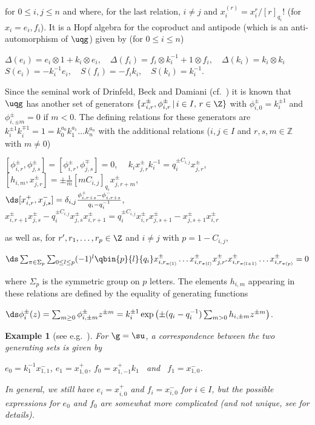 \documentclass[11pt]{amsart}
\newtheorem{example}[theorem]{Example}
\theoremstyle{definition}
\theoremstyle{remark}
\numberwithin{equation}{section}
\begin{document}
for $0\leq i,j \leq n$ and where, for the last relation, $i\neq j$ and $x_i^{(r)} = x_i^r/[r]_{q_i}!$ (for $x_i = e_i,f_i$). It is a Hopf algebra for the coproduct and antipode (which is an anti-automorphism of $\uqg$) given by (for $0\leq i\leq n$)
\begin{center}
$\Delta(e_i) = e_i\otimes 1+k_i\otimes e_i, \quad \Delta(f_i) = f_i\otimes k_i^{-1}+1\otimes f_i, \quad \Delta(k_i) = k_i\otimes k_i$ \smallskip\\
$ S(e_i) = -k_i^{-1}e_i, \quad S(f_i) = -f_ik_i, \quad S(k_i) = k_i^{-1}.$
\end{center}
Since the seminal work of Drinfeld, Beck and Damiani (cf.~\cite{dr1,b,da1,da2}) it is known that $\uqg$ has another set of generators $\{x_{i,r}^{\pm}, \phi_{i,r}^{\pm}\,|\, i\in I,\, r \in \Z\}$ with $\phi_{i,0}^{\pm}=k_i^{\pm 1}$ and $\phi_{i,\pm m}^{\pm} = 0$ if $m < 0$. The defining relations for these generators are $k_i^{\pm 1}k_i^{\mp 1} = 1 = k_0^{a_0}k_1^{a_1}\dots k_n^{a_n}$ with the additional relations ($i,j \in I$ and $r,s,m \in \mathbb{Z}$ with $m\neq 0$)
\begin{center}
$[\phi_{i,r}^{\pm},\phi_{j,s}^{\pm}] = [\phi_{i,r}^{\pm},\phi_{j,s}^{\mp}] = 0$, \ \ 
$k_i x_{j,r}^{\pm} k_i^{-1} = q_i^{\pm C_{i,j}}x_{j,r}^{\pm}$, \ \ 
$[h_{i,m},x_{j,r}^{\pm}] = \pm \frac{1}{m}[mC_{i,j}]_{q_i}x_{j,r+m}^{\pm}$, \\ $\ds[x_{i,r}^+,x_{j,s}^-] = \delta_{i,j}\frac{\phi_{i,r+s}^+-\phi_{i,r+s}^-}{q_i-q_i^{-1}}$, \quad
$x_{i,r+1}^{\pm}x_{j,s}^{\pm}-q_i^{\pm C_{i,j}}x_{j,s}^{\pm}x_{i,r+1}^{\pm}=q_i^{\pm C_{i,j}}x_{i,r}^{\pm}x_{j,s+1}^{\pm}-x_{j,s+1}^{\pm}x_{i,r}^{\pm}$
\end{center}
as well as, for $r',r_1,\dots ,r_p \in \Z$ and $i\neq j$ with $p = 1-C_{i,j}$,
\begin{center}
$\ds \sum_{\pi \in \Sigma_p}\sum_{0\leq l\leq p}(-1)^l \qbin{p}{l}{q_i}x_{i,r_{\pi(1)}}^{\pm}\dots x_{i,r_{\pi(l)}}^{\pm}x_{j,r'}^{\pm}x_{i,r_{\pi(l+1)}}^{\pm}\dots x_{i,r_{\pi(p)}}^{\pm}=0$
\end{center}
where $\Sigma_p$ is the symmetric group on $p$ letters. The elements $h_{i,m}$ appearing in these relations are defined by the equality of generating functions
\begin{center}
$\ds\phi_i^{\pm}(z)=\sum_{m\geq 0} \phi_{i,\pm m}^{\pm} z^{\pm m} = k_i^{\pm 1}\exp\left(\pm(q_i-q_i^{-1})\sum_{m>0}h_{i,\pm m}z^{\pm m}\right)$.
\end{center}
\begin{example}[see e.g.~{\cite[Example 2.1]{fh1}}]\label{ex:DJDsl2} For $\g = \su$, a correspondence between the two generating sets is given by
\begin{center}
$e_0 = k_1^{-1}x_{1,1}^-$, \quad $e_1 = x_{1,0}^+$, \quad $f_0 = x_{1,-1}^+k_1$ \ and \ $f_1 = x_{1,0}^-$.
\end{center}
In general, we still have $e_i = x_{i,0}^+$ and $f_i = x_{i,0}^-$ for $i\in I$, but the possible expressions for $e_0$ and $f_0$ are somewhat more complicated (and not unique, see \cite{cp2} for details).
\end{example}
\end{document}
